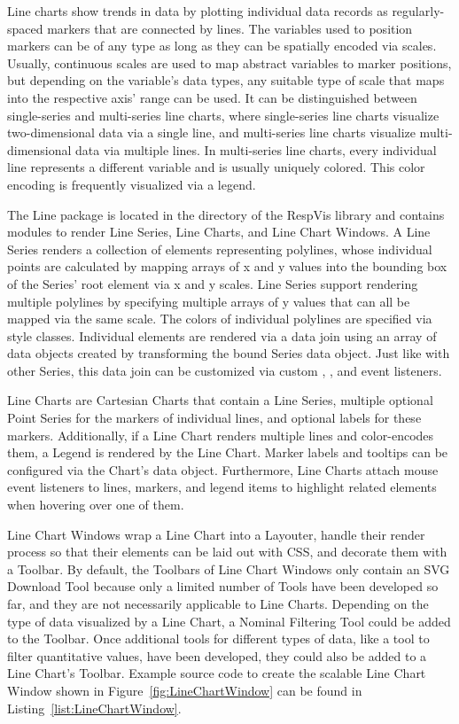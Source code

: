 Line charts show trends in data by plotting individual data records as
regularly-spaced markers that are connected by lines. The variables
used to position markers can be of any type as long as they can be
spatially encoded via scales. Usually, continuous scales are used to
map abstract variables to marker positions, but depending on the
variable's data types, any suitable type of scale that maps into the
respective axis' range can be used. It can be distinguished between
single-series and multi-series line charts, where single-series line
charts visualize two-dimensional data via a single line, and
multi-series line charts visualize multi-dimensional data via multiple
lines. In multi-series line charts, every individual line represents a
different variable and is usually uniquely colored. This color
encoding is frequently visualized via a legend.  

The Line package is located in the  directory of
the RespVis library and contains modules to render Line Series, Line
Charts, and Line Chart Windows. A Line Series renders a collection of
 elements representing polylines, whose individual
points are calculated by mapping arrays of x and y values into the
bounding box of the Series' root element via x and y scales. Line
Series support rendering multiple polylines by specifying multiple
arrays of y values that can all be mapped via the same scale. The
colors of individual polylines are specified via style classes.
Individual  elements are rendered via a data join using
an array of data objects created by transforming the bound Series data
object. Just like with other Series, this data join can be customized
via custom , , and  event
listeners. 

Line Charts are Cartesian Charts that contain a Line Series, multiple
optional Point Series for the markers of individual lines, and
optional labels for these markers. Additionally, if a Line Chart
renders multiple lines and color-encodes them, a Legend is rendered by
the Line Chart. Marker labels and tooltips can be configured via the
Chart's data object. Furthermore, Line Charts attach mouse event
listeners to lines, markers, and legend items to highlight related
elements when hovering over one of them.

Line Chart Windows wrap a Line Chart into a Layouter, handle their
render process so that their elements can be laid out with CSS, and
decorate them with a Toolbar. By default, the Toolbars of Line Chart
Windows only contain an SVG Download Tool because only a limited
number of Tools have been developed so far, and they are not
necessarily applicable to Line Charts. Depending on the type of data
visualized by a Line Chart, a Nominal Filtering Tool could be added to
the Toolbar. Once additional tools for different types of data, like a
tool to filter quantitative values, have been developed, they could
also be added to a Line Chart's Toolbar. Example source code to create
the scalable Line Chart Window shown in
Figure~\ref{fig:LineChartWindow} can be found in
Listing~\ref{list:LineChartWindow}.





